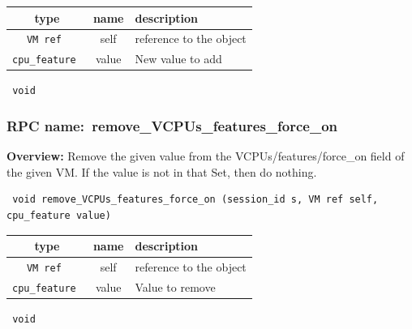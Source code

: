  
\vspace{0.3cm}
\begin{tabular}{|c|c|p{7cm}|}
 \hline
{\bf type} & {\bf name} & {\bf description} \\ \hline
{\tt VM ref } & self & reference to the object \\ \hline 

{\tt cpu\_feature } & value & New value to add \\ \hline 

\end{tabular}

\vspace{0.3cm}

{\tt 
void
}



\vspace{0.3cm}
\vspace{0.3cm}
\vspace{0.3cm}
\subsubsection{RPC name:~remove\_VCPUs\_features\_force\_on}

{\bf Overview:} 
Remove the given value from the VCPUs/features/force\_on field of the given VM.  If the value is not in that Set, then do nothing.

\begin{verbatim} void remove_VCPUs_features_force_on (session_id s, VM ref self, cpu_feature value)\end{verbatim}



 
\vspace{0.3cm}
\begin{tabular}{|c|c|p{7cm}|}
 \hline
{\bf type} & {\bf name} & {\bf description} \\ \hline
{\tt VM ref } & self & reference to the object \\ \hline 

{\tt cpu\_feature } & value & Value to remove \\ \hline 

\end{tabular}

\vspace{0.3cm}

{\tt 
void
}



\vspace{0.3cm}
\vspace{0.3cm}
\vspace{0.3cm}
